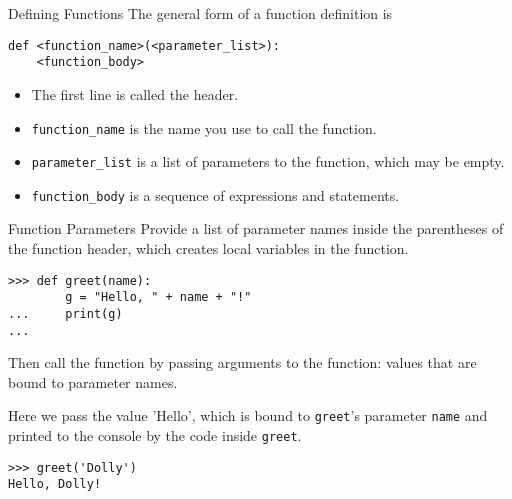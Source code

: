 \documentclass[smaller, aspectratio=1610]{beamer}
\begin{document}
\begin{frame}[label={sec:org2ac6e11},fragile]{Defining Functions}
 The general form of a function definition is

\lstset{language=Python,label= ,caption= ,captionpos=b,numbers=none}
\begin{lstlisting}
def <function_name>(<parameter_list>):
    <function_body>
\end{lstlisting}

\begin{itemize}
\item The first line is called the header.
\item \texttt{function\_name} is the name you use to call the function.
\item \texttt{parameter\_list} is a list of parameters to the function, which may be empty.
\item \texttt{function\_body} is a sequence of expressions and statements.
\end{itemize}
\end{frame}

\begin{frame}[label={sec:org4b2652d},fragile]{Function Parameters}
 Provide a list of parameter names inside the parentheses of the function header, which creates local variables in the function.

\lstset{language=Python,label= ,caption= ,captionpos=b,numbers=none}
\begin{lstlisting}
>>> def greet(name):
        g = "Hello, " + name + "!"
...     print(g)
...
\end{lstlisting}

Then call the function by passing \alert{arguments} to the function: values that are bound to parameter names.

Here we pass the value 'Hello', which is bound to \texttt{greet}'s parameter \texttt{name} and printed to the console by the code inside \texttt{greet}.

\lstset{language=Python,label= ,caption= ,captionpos=b,numbers=none}
\begin{lstlisting}
>>> greet('Dolly')
Hello, Dolly!
\end{lstlisting}
\end{frame}
\end{document}
